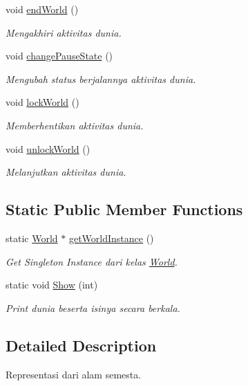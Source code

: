 \begin{DoxyCompactItemize}
void \hyperlink{class_world_a30a87c6071aef420fc2e9df913a7452d}{end\+World} ()
\begin{DoxyCompactList}\small\item\em Mengakhiri aktivitas dunia. \end{DoxyCompactList}\item 
void \hyperlink{class_world_a1df17b17270667dc2ff9ff52f6ade6c0}{change\+Pause\+State} ()
\begin{DoxyCompactList}\small\item\em Mengubah status berjalannya aktivitas dunia. \end{DoxyCompactList}\item 
void \hyperlink{class_world_a63197059e4c4f18349aec3c1daa66a01}{lock\+World} ()
\begin{DoxyCompactList}\small\item\em Memberhentikan aktivitas dunia. \end{DoxyCompactList}\item 
void \hyperlink{class_world_a08481fdff65e290c44386676ce993dce}{unlock\+World} ()
\begin{DoxyCompactList}\small\item\em Melanjutkan aktivitas dunia. \end{DoxyCompactList}\end{DoxyCompactItemize}
\subsection*{Static Public Member Functions}
\begin{DoxyCompactItemize}
\item 
static \hyperlink{class_world}{World} $\ast$ \hyperlink{class_world_a7a8d0b3f76f0ecde36ffe28f9b08f30f}{get\+World\+Instance} ()
\begin{DoxyCompactList}\small\item\em Get Singleton Instance dari kelas \hyperlink{class_world}{World}. \end{DoxyCompactList}\item 
static void \hyperlink{class_world_a5013e1294abc50b60ffa747bcd4499f4}{Show} (int)
\begin{DoxyCompactList}\small\item\em Print dunia beserta isinya secara berkala. \end{DoxyCompactList}\end{DoxyCompactItemize}


\subsection{Detailed Description}
Representasi dari alam semesta. 

